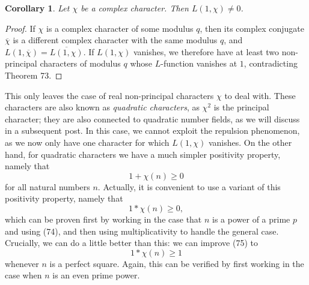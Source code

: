 \documentclass[10pt,reqno]{amsart}
\newtheorem{corollary}[theorem]{Corollary}
\begin{document}
\begin{corollary}
    Let $\chi$ be a complex character. Then $L(1,\chi) \neq 0$.
\end{corollary}
\begin{proof}
    If $\chi$ is a complex character of some modulus $q$, then its complex conjugate $\overline{\chi}$ is a different complex character with the same modulus $q$, and $L(1,\overline{\chi}) = \overline{L(1,\chi)}$. If $L(1,\chi)$ vanishes, we therefore have at least two non-principal characters of modulus $q$ whose $L$-function vanishes at $1$, contradicting Theorem 73. %
\end{proof}

This only leaves the case of real non-principal characters $\chi$ to deal with. These characters are also known as \emph{quadratic characters}, as $\chi^2$ is the principal character; they are also connected to quadratic number fields, as we will discuss in a subsequent post. In this case, we cannot exploit the repulsion phenomenon, as we now only have one character for which $L(1,\chi)$ vanishes. On the other hand, for quadratic characters we have a much simpler positivity property, namely that
%
\begin{equation}   1 + \chi(n) \geq 0 \end{equation}
%
for all natural numbers $n$. Actually, it is convenient to use a variant of this positivity property, namely that
%
\begin{equation}   1 * \chi(n) \geq 0, \end{equation}
%
which can be proven first by working in the case that $n$ is a power of a prime $p$ and using (74), and then using multiplicativity to handle the general case. Crucially, we can do a little better than this: we can improve (75) to
%
\begin{equation}   1 * \chi(n) \geq 1 \end{equation}
%
whenever $n$ is a perfect square. Again, this can be verified by first working in the case when $n$ is an even prime power.
\end{document}
